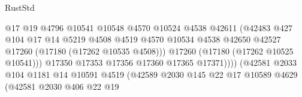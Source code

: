 \begin{lexlean}{RustStd}
\begin{coremodule}
{\begin{coremodule}
{{{{{{{{{{{{{{{{{{{{{{{{{{{{{{{{{{{{{{{{{{{{{{{{{{{{{{{                                              @17
                                              @19
                                              @4796
                                              @10541
                                              @10548
                                              @4570
                                              @10524
                                              @4538
                                              @42611
                                              (@42483
                                                @427
                                                @104
                                                @17
                                                @14
                                                @5219
                                                @4508
                                                @4519
                                                @4570
                                                @10534
                                                @4538
                                                @42650
                                                @42527
                                                @17260
                                                (@17180 (@17262 @10535 @4508)))
                                              @17260
                                              (@17180 (@17262 @10525 @10541)))
                                            @17350
                                            @17353
                                            @17356
                                            @17360
                                            @17365
                                            @17371))))
                                    (@42581
                                      @2033
                                      @104
                                      @1181
                                      @14
                                      @10591
                                      @4519
                                      (@42589
                                        @2030
                                        @145
                                        @22
                                        @17
                                        @10589
                                        @4629
                                        (@42581
                                          @2030
                                          @406
                                          @22
                                          @19
}}}}}}}}}}}}}}}}}}}}}}}}}}}}}}}}}}}}}}}}}}}}}}}}}}}}}}}
\end{coremodule}}
\end{coremodule}
\end{lexlean}

